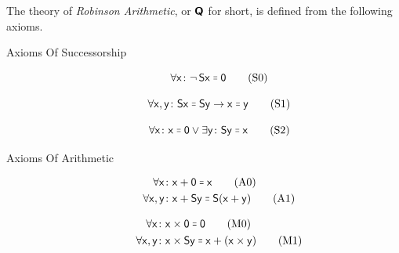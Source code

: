 \documentclass{article}
\theoremstyle{customstyle}
\newcommand{\fm}[1]{\mathsf{#1}}
\newcommand{\fmeq}{\mathrel{\resizebox{1.15\height}{1.15\height}{=}}}
\newcommand{\Q}{\textbf{\textsf{Q}}}
\begin{document}
\begin{definition}
  The theory of \emph{Robinson Arithmetic}, or $\Q$ for short, is defined from the following axioms.
  \begin{description}
    \item[Axioms Of Successorship]
          \hfill\newline
          \begin{minipage}{0.225\textwidth}
            \noindent\smallskip
            \[
              \forall \fm{x} \colon \neg\, \fm{S}\fm{x} \fmeq \fm{0} \tag{S0}\label{S0}
            \]
          \end{minipage}
          \quad
          \begin{minipage}{0.3\textwidth}
            \noindent\smallskip
            \[
              \forall \fm{x}, \fm{y} \colon \fm{S}\fm{x} \fmeq \fm{S}\fm{y} \rightarrow \fm{x} \fmeq \fm{y} \tag{S1}\label{S1}
            \]
          \end{minipage}
          \quad
          \begin{minipage}{0.3\textwidth}
            \noindent\smallskip
            \[
              \forall \fm{x} \colon \fm{x} \fmeq \fm{0} \lor \exists \fm{y} \colon \fm{S}\fm{y} \fmeq \fm{x} \tag{S2}\label{S2}
            \]
          \end{minipage}
    \item[Axioms Of Arithmetic]
          \hfill\newline
          \begin{minipage}{0.4\textwidth}
            \noindent
            \begin{align*}
              \forall \fm{x} \colon         & \fm{x} + \fm{0} \fmeq \fm{x} \tag{A0}\label{A0}                        \\
              \forall \fm{x}, \fm{y} \colon & \fm{x} + \fm{S}\fm{y} \fmeq \fm{S}(\fm{x} + \fm{y}) \tag{A1}\label{A1}
            \end{align*}
          \end{minipage}
          \begin{minipage}{0.4\textwidth}
            \noindent
            \begin{align*}
              \forall \fm{x} \colon         & \fm{x} \times \fm{0} \fmeq \fm{0} \tag{M0}\label{M0}                                \\
              \forall \fm{x}, \fm{y} \colon & \fm{x} \times \fm{S}\fm{y} \fmeq \fm{x} + (\fm{x} \times \fm{y}) \tag{M1}\label{M1}
            \end{align*}
          \end{minipage}
  \end{description}
\end{definition}
\end{document}
